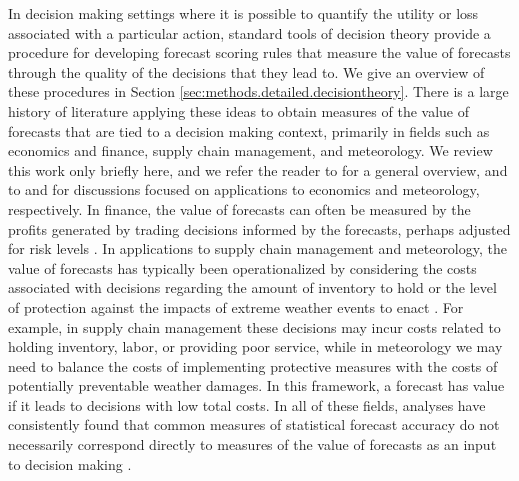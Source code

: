 \documentclass{article}\usepackage[]{graphicx}\usepackage[]{xcolor}
\begin{document}
In decision making settings where it is possible to quantify the utility or loss associated with a particular action, standard tools of decision theory provide a procedure for developing forecast scoring rules that measure the value of forecasts through the quality of the decisions that they lead to. We give an overview of these procedures in Section \ref{sec:methods.detailed.decisiontheory}.
There is a large history of literature applying these ideas to obtain measures of the value of forecasts that are tied to a decision making context, primarily in fields such as economics and finance, supply chain management, and meteorology. We review this work only briefly here, and we refer the reader to \cite{yardley2021utility_cost_forecasts} for a general overview, and to \cite{pesaran2002decision_based_eval} and \cite{murphy1993whatisagoodforecast} for discussions focused on applications to economics and meteorology, respectively. In finance, the value of forecasts can often be measured by the profits generated by trading decisions informed by the forecasts, perhaps adjusted for risk levels \cite[e.g.,][]{leitch1991economicForecastEval, cenesizoglu2012returnPredictionEconValue}. In applications to supply chain management and meteorology, the value of forecasts has typically been operationalized by considering the costs associated with decisions regarding the amount of inventory to hold or the level of protection against the impacts of extreme weather events to enact \cite[e.g.,][]{catt2007assessingcostofforecasterror, petropoulos2019inventoryperformanceforecasting, palmer2002economic, pappenberger2015monetarybenefitfloodwarnings}. For example, in supply chain management these decisions may incur costs related to holding inventory, labor, or providing poor service, while in meteorology we may need to balance the costs of implementing protective measures with the costs of potentially preventable weather damages. In this framework, a forecast has value if it leads to decisions with low total costs. In all of these fields, analyses have consistently found that common measures of statistical forecast accuracy do not necessarily correspond directly to measures of the value of forecasts as an input to decision making \cite[e.g.,][]{leitch1991economicForecastEval, murphy1993whatisagoodforecast, cenesizoglu2012returnPredictionEconValue}.
\end{document}
